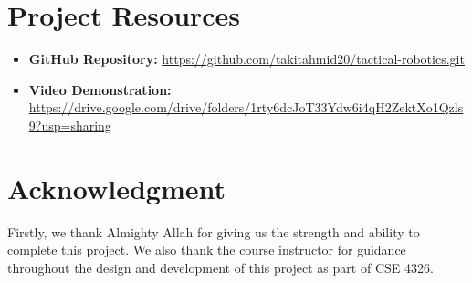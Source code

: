 \documentclass[conference]{IEEEtran}
\begin{document}
\section*{Project Resources}
\begin{itemize}
    \item \textbf{GitHub Repository:} \url{https://github.com/takitahmid20/tactical-robotics.git}
    \item \textbf{Video Demonstration:} \url{https://drive.google.com/drive/folders/1rty6dcJoT33Ydw6i4qH2ZektXo1Qzls9?usp=sharing}
\end{itemize}

\section*{Acknowledgment}
Firstly, we thank Almighty Allah for giving us the strength and ability to complete this project. We also thank the course instructor for guidance throughout the design and development of this project as part of CSE 4326.
\end{document}
